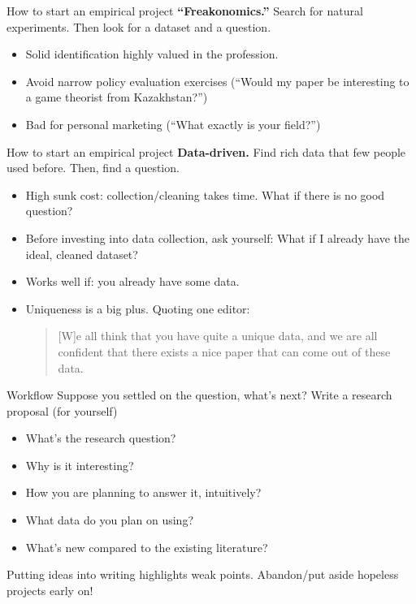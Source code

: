 \documentclass[notes=show,beamer,compress]{beamer}
\begin{document}
\begin{frame}{How to start an empirical project}
	\textbf{``Freakonomics.''} Search for natural experiments. Then look for a dataset and a question.
	\begin{itemize}
		\item{Solid identification highly valued in the profession.}
		\item{Avoid narrow policy evaluation exercises (``Would my paper be interesting to a game theorist from Kazakhstan?'')}
		\item{Bad for personal marketing (``What exactly is your field?'')}
	\end{itemize}
\end{frame}

%

\begin{frame}{How to start an empirical project}
	\textbf{Data-driven.} Find rich data that few people used before. Then, find a question.
	\begin{itemize}
		\item{High sunk cost: collection/cleaning takes time. What if there is no good question?}
		\item{Before investing into data collection, ask yourself: What if I already have the ideal, cleaned dataset?}
		\item{Works well if: you already have some data.}
		\item{Uniqueness is a big plus. Quoting one editor:
			\begin{quote}
				[W]e all think that you have quite a unique data, and we are all confident that there exists a nice paper that can come out of these data.
		\end{quote}}
	\end{itemize}
\end{frame}

\begin{frame}{Workflow}
	Suppose you settled on the question, what's next? Write a research proposal (for yourself)
			\begin{itemize}
				\item What's the research question?
				\item Why is it interesting?
				\item How you are planning to answer it, intuitively?
				\item What data do you plan on using?
				\item What's new compared to the existing literature?
			\end{itemize}
	
	\bigskip
	
	Putting ideas into writing highlights weak points. Abandon/put aside hopeless projects early on!
\end{frame}
\end{document}
